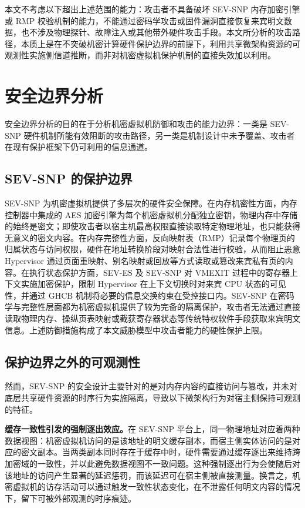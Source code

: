 本文不考虑以下超出上述范围的能力：攻击者不具备破坏 SEV-SNP 内存加密引擎或 RMP 校验机制的能力，不能通过密码学攻击或固件漏洞直接恢复来宾明文数据，也不涉及物理探针、故障注入或其他带外硬件攻击手段。本文所分析的攻击路径，本质上是在不突破机密计算硬件保护边界的前提下，利用共享微架构资源的可观测性实施侧信道推断，而非对机密虚拟机保护机制的直接失效加以利用。

\section{安全边界分析}

安全边界分析的目的在于分析机密虚拟机防御和攻击的能力边界：一类是 SEV-SNP 硬件机制所能有效阻断的攻击路径，另一类是机制设计中未予覆盖、攻击者在现有保护框架下仍可利用的信息通道。

\subsection{SEV-SNP 的保护边界}

SEV-SNP 为机密虚拟机提供了多层次的硬件安全保障。在内存机密性方面，内存控制器中集成的 AES 加密引擎为每个机密虚拟机分配独立密钥，物理内存中存储的始终是密文；即使攻击者以宿主机最高权限直接读取特定物理地址，也只能获得无意义的密文内容\cite{kaplan2016amd,amd_sev_snp_whitepaper}。在内存完整性方面，反向映射表（RMP）记录每个物理页的归属状态与访问权限，硬件在地址转换阶段对映射合法性进行校验，从而阻止恶意 Hypervisor 通过页面重映射、别名映射或回放等方式读取或篡改来宾私有页的内容\cite{amd_sev_snp_whitepaper}。在执行状态保护方面，SEV-ES 及 SEV-SNP 对 VMEXIT 过程中的寄存器上下文实施加密保护，限制 Hypervisor 在上下文切换时对来宾 CPU 状态的可见性，并通过 GHCB 机制将必要的信息交换约束在受控接口内\cite{amd_sev_es_whitepaper}。SEV-SNP 在密码学与完整性层面都为机密虚拟机提供了较为完备的隔离保护，攻击者无法通过直接读取物理内存、操纵页表映射或截获寄存器状态等传统特权软件手段获取来宾明文信息。上述防御措施构成了本文威胁模型中攻击者能力的硬性保护上限。

\subsection{保护边界之外的可观测性}

然而，SEV-SNP 的安全设计主要针对的是对内存内容的直接访问与篡改，并未对底层共享硬件资源的时序行为实施隔离，导致以下微架构行为对宿主侧保持可观测的特征。

\textbf{缓存一致性引发的强制逐出效应。}在 SEV-SNP 平台上，同一物理地址对应着两种数据视图：机密虚拟机访问的是该地址的明文缓存副本，而宿主侧实体访问的是对应的密文副本。当两类副本同时存在于缓存中时，硬件需要通过缓存逐出来维持跨加密域的一致性，并以此避免数据视图不一致问题。这种强制逐出行为会使随后对该地址的访问产生显著的延迟惩罚，而该延迟可在宿主侧被直接测量\cite{giner2025coherereload}。换言之，机密虚拟机的访存活动可以通过触发一致性状态变化，在不泄露任何明文内容的情况下，留下可被外部观测的时序痕迹。

